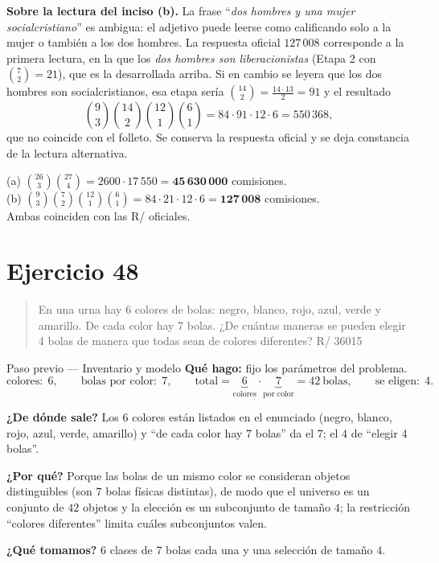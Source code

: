\documentclass[11pt]{article}
\begin{document}
\begin{nota}
\textbf{Sobre la lectura del inciso (b).} La frase ``\emph{dos hombres y una mujer socialcristiano}'' es
ambigua: el adjetivo puede leerse como calificando solo a la mujer o tambi\'en a los dos hombres. La
respuesta oficial $127\,008$ corresponde a la primera lectura, en la que los \emph{dos hombres son
liberacionistas} (Etapa 2 con $\binom{7}{2}=21$), que es la desarrollada arriba. Si en cambio se leyera que
los dos hombres son socialcristianos, esa etapa ser\'ia
$\binom{14}{2}=\frac{14\cdot 13}{2}=91$ y el resultado
\[
\binom{9}{3}\binom{14}{2}\binom{12}{1}\binom{6}{1}=84\cdot 91\cdot 12\cdot 6=550\,368 ,
\]
que no coincide con el folleto. Se conserva la respuesta oficial y se deja constancia de la lectura
alternativa.
\end{nota}

\begin{resp}
(a) $\displaystyle \binom{26}{3}\binom{27}{4}=2600\cdot 17\,550=\mathbf{45\,630\,000}$ comisiones.\\[4pt]
(b) $\displaystyle \binom{9}{3}\binom{7}{2}\binom{12}{1}\binom{6}{1}=84\cdot 21\cdot 12\cdot 6=\mathbf{127\,008}$ comisiones.\\
Ambas coinciden con las R/ oficiales.
\end{resp}

\section*{Ejercicio 48}

\begin{quote}
En una urna hay 6 colores de bolas: negro, blanco, rojo, azul, verde y amarillo. De cada color hay 7 bolas.
¿De cu\'antas maneras se pueden elegir 4 bolas de manera que todas sean de colores diferentes?
\hfill R/ 36015
\end{quote}

\begin{paso}{Paso previo --- Inventario y modelo}
\textbf{Qu\'e hago:} fijo los par\'ametros del problema.
\[
\text{colores}:\;6,\qquad \text{bolas por color}:\;7,\qquad
\text{total}=\underbrace{6}_{\text{colores}}\cdot\underbrace{7}_{\text{por color}}=42\ \text{bolas},
\qquad \text{se eligen}:\;4 .
\]

\textbf{¿De d\'onde sale?} Los $6$ colores est\'an listados en el enunciado (negro, blanco, rojo, azul,
verde, amarillo) y ``de cada color hay 7 bolas'' da el $7$; el $4$ de ``elegir 4 bolas''.

\textbf{¿Por qu\'e?} Porque las bolas de un mismo color se consideran objetos distinguibles (son $7$ bolas
f\'isicas distintas), de modo que el universo es un conjunto de $42$ objetos y la elecci\'on es un
subconjunto de tama\~no $4$; la restricci\'on ``colores diferentes'' limita cu\'ales subconjuntos valen.

\textbf{¿Qu\'e tomamos?} $6$ clases de $7$ bolas cada una y una selecci\'on de tama\~no $4$.
\end{paso}
\end{document}
